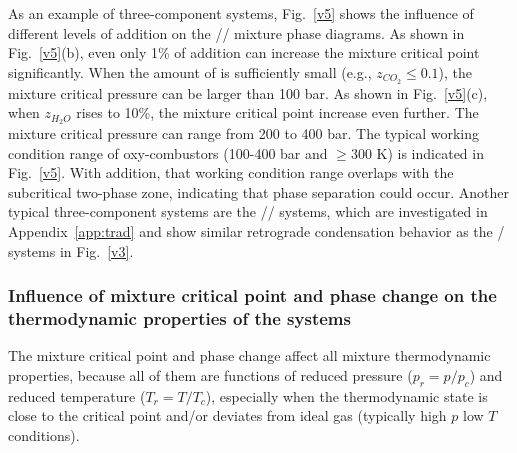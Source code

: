 As an example of three-component  systems, Fig.~\ref{v5} shows the influence of different levels of  addition on the // mixture phase diagrams.
As shown in Fig.~\ref{v5}(b), even only 1\% of  addition can increase the mixture critical point significantly. When the amount of  is sufficiently small (e.g., $z_{CO_2}\leq0.1$), the mixture critical pressure can be larger than 100 bar. %
As shown in Fig.~\ref{v5}(c), when $z_{H_2O}$ rises to 10\%, the mixture critical point increase even further. The mixture critical pressure can range from 200 to 400 bar.
The typical working condition range of  oxy-combustors (100-400 bar and $\ge300$ K) is indicated in Fig.~\ref{v5}. With  addition, that working condition range overlaps with the subcritical two-phase zone, indicating that phase separation could occur.
Another typical three-component  systems are the // systems, which are investigated in Appendix~\ref{app:trad} and show similar retrograde condensation behavior as the / systems in Fig.~\ref{v3}.


\subsubsection{Influence of mixture critical point and phase change on the thermodynamic properties of the  systems}
\label{sec:results:combustor:phase}
The mixture critical point and phase change affect all mixture thermodynamic properties, because all of them are functions of reduced pressure ($p_r=p/p_c$) and reduced temperature ($T_r=T/T_c$), especially when the thermodynamic state is close to the critical point and/or deviates from ideal gas (typically high $p$ low $T$ conditions). %

